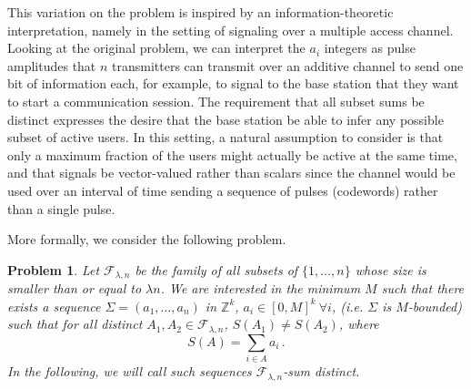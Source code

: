 \documentclass[a4paper]{amsart}
\theoremstyle{plain}
\newtheorem{Problem}[Definition]{Problem}
\begin{document}
This variation on the problem is inspired by an information-theoretic interpretation, namely in the setting of signaling over a multiple access channel. Looking at the original problem, we can interpret the $a_i$ integers as pulse amplitudes that $n$ transmitters can transmit over an additive channel to send one bit of information each, for example, to signal to the base station that they want to start a communication session. The requirement that all subset sums be distinct expresses the desire that the base station be able to infer any possible subset of active users. In this setting, a natural assumption to consider is that only a maximum fraction of the users might actually be active at the same time, and that signals be vector-valued rather than scalars since the channel would be used over an interval of time sending a sequence of pulses (codewords) rather than a single pulse.


More formally, we consider the following problem.
\begin{Problem}\label{SmallSize}
Let $\mathcal{F}_{\lambda,n}$ be the family of all subsets of $\{1,\dots,n\}$ whose size is smaller than or equal to $\lambda n$. We are interested in the minimum $M$ such that there exists a sequence $\Sigma=(a_1,\dots,a_n)$ in $\mathbb{Z}^k$, $a_i\in [0,M]^k\ \forall i$, (i.e. $\Sigma$ is $M$-bounded) such that for all distinct $A_1,A_2\in\mathcal{F}_{\lambda,n}$, $S(A_1)\neq S(A_2)$, where
$$S(A)=\sum_{i\in A} a_i\,.$$
In the following, we will call such sequences $\mathcal{F}_{\lambda,n}$-sum distinct.
\end{Problem}
\end{document}
